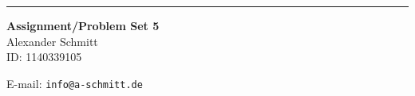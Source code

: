 \documentclass{article}
\begin{document}
\begin{CJK}{UTF8}{gbsn}


\hrule

\vspace{0.4in}
\begin{center}
{\bf Assignment/Problem Set 5\\}
\bigskip
Alexander Schmitt\\
ID: 1140339105\\
\smallskip
\date
\bigskip

E-mail: {\tt info@a-schmitt.de}\\

\end{center}

\newcommand{\ppath}{.}


%
\newpage
\end{CJK}
\end{document}
